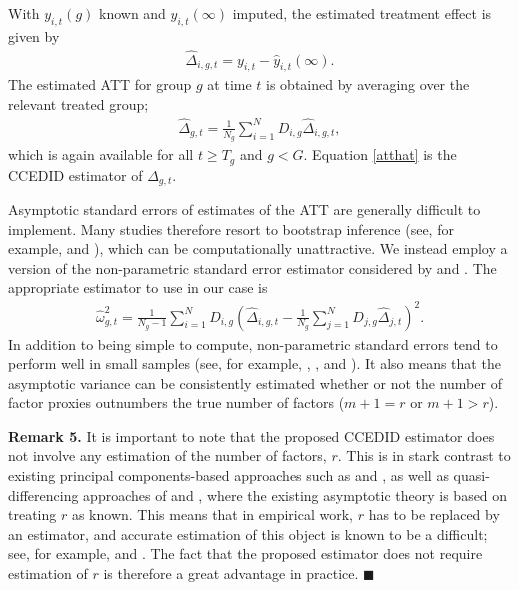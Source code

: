 \documentclass[12pt,fleqn]{article}
\begin{document}
\bigskip

With $y_{i,t}(g)$ known and $y_{i,t}(\infty)$ imputed, the estimated treatment effect is given by
\begin{align}
\widehat \Delta_{i,g,t} = y_{i,t} - \widehat y_{i,t}(\infty) . \label{theat}
\end{align}
The estimated ATT for group $g$ at time $t$ is obtained by averaging over the relevant treated group;
\begin{align}
\widehat \Delta_{g,t} = \frac{1}{N_g}\sum_{i = 1}^N D_{i,g} \widehat \Delta_{i,g,t}, \label{atthat}
\end{align}
which is again available for all $t \geq T_g$ and $g < G$. Equation \eqref{atthat} is the CCEDID estimator of $\Delta_{g,t}$.

Asymptotic standard errors of estimates of the ATT are generally difficult to implement. Many studies therefore resort to bootstrap inference (see, for example, \citet{Callaway_Karami_2020} and \citet{Xu_2017}), which can be computationally unattractive. We instead employ a version of the non-parametric standard error estimator considered by \citet{chudik2011weak} and \citet{pesaran2006estimation}. The appropriate estimator to use in our case is
\begin{align}
\widehat \omega_{g,t}^2 = \frac{1}{N_g-1}\sum_{i = 1}^N D_{i,g} \left(\widehat \Delta_{i,g,t}  - \frac{1}{N_g}\sum_{j = 1}^N D_{j,g} \widehat \Delta_{j,t}\right)^2.\label{nonparametric variance estimator}
\end{align}
In addition to being simple to compute, non-parametric standard errors tend to perform well in small samples (see, for example, \citet{chudik2011weak}, \citet{pesaran2006estimation}, and \citet{westerlund2022cce}). It also means that the asymptotic variance can be consistently estimated whether or not the number of factor proxies outnumbers the true number of factors ($m+1=r$ or $m+1 > r$).

\bigskip

\noindent \textbf{Remark 5.} It is important to note that the proposed CCEDID estimator does not involve any estimation of the number of factors, $r$. This is in stark contrast to existing principal components-based approaches such as \citet{chan2022pcdid} and \citet{Xu_2017}, as well as quasi-differencing approaches of \citet{Callaway_Karami_2020} and \citet{brown2022generalized}, where the existing asymptotic theory is based on treating $r$ as known. This means that in empirical work, $r$ has to be replaced by an estimator, and accurate estimation of this object is known to be a difficult; see, for example, \citet{moon2015linear} and \citet{breitung2021alternative}. The fact that the proposed estimator does not require estimation of $r$ is therefore a great advantage in practice. $\blacksquare$
\end{document}

